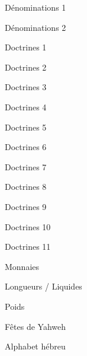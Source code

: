 \documentclass[11pt]{book}
\begin{document}
\clearpage
\begin{center}Dénominations 1\end{center}\clearpage
\begin{center}Dénominations 2\end{center}\clearpage
\clearpage
\begin{center}Doctrines 1\end{center}\clearpage
\begin{center}Doctrines 2\end{center}\clearpage
\begin{center}Doctrines 3\end{center}\clearpage
\begin{center}Doctrines 4\end{center}\clearpage
\begin{center}Doctrines 5\end{center}\clearpage
\begin{center}Doctrines 6\end{center}\clearpage
\begin{center}Doctrines 7\end{center}\clearpage
\begin{center}Doctrines 8\end{center}\clearpage
\begin{center}Doctrines 9\end{center}\clearpage
\begin{center}Doctrines 10\end{center}\clearpage
\begin{center}Doctrines 11\end{center}\clearpage
\clearpage
\begin{center}Monnaies\end{center}\clearpage
\clearpage
\begin{center}Longueurs / Liquides\end{center}\clearpage
\clearpage
\begin{center}Poids\end{center}\clearpage
\clearpage
\begin{center}Fêtes de Yahweh\end{center}\clearpage
\clearpage
\begin{center}Alphabet hébreu\end{center}\clearpage
\end{document}
